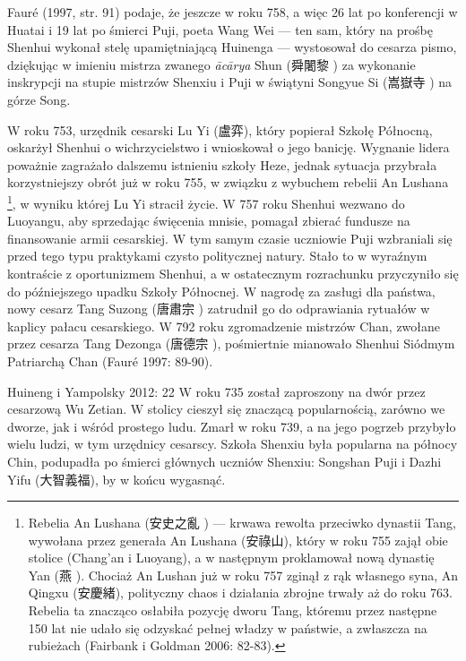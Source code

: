 Fauré (1997, str. 91) podaje, że jeszcze w roku 758, a więc 26 lat po konferencji w Huatai i 19 lat po śmierci Puji, poeta Wang Wei --- ten sam, który na prośbę Shenhui wykonał stelę upamiętniającą Huinenga --- wystosował do cesarza pismo, dziękując w imieniu mistrza zwanego \textit{ācārya} Shun (舜闍黎 ) za wykonanie inskrypcji na stupie mistrzów Shenxiu i Puji w świątyni Songyue Si (嵩嶽寺 ) na górze Song.

W roku 753, urzędnik cesarski Lu Yi (盧弈), który popierał Szkołę Północną, oskarżył Shenhui o wichrzycielstwo i wnioskował o jego banicję.
Wygnanie lidera poważnie zagrażało dalszemu istnieniu szkoły Heze, jednak sytuacja przybrała korzystniejszy obrót już w roku 755, w związku z wybuchem rebelii An Lushana%
\footnote{Rebelia An Lushana (安史之亂 ) --- krwawa rewolta przeciwko dynastii Tang, wywołana przez generała An Lushana (安祿山), który w roku 755 zajął obie stolice (Chang'an i Luoyang), a w następnym proklamował nową dynastię Yan (燕 ). Chociaż An Lushan już w roku 757 zginął z rąk własnego syna, An Qingxu (安慶緒), polityczny chaos i działania zbrojne trwały aż do roku 763. Rebelia ta znacząco osłabiła pozycję dworu Tang, któremu przez następne 150 lat nie udało się odzyskać pełnej władzy w państwie, a zwłaszcza na rubieżach (Fairbank i Goldman 2006: 82-83).}, w wyniku której Lu Yi stracił życie.
W 757 roku Shenhui wezwano do Luoyangu, aby sprzedając święcenia mnisie, pomagał zbierać fundusze na finansowanie armii cesarskiej.
W tym samym czasie uczniowie Puji wzbraniali się przed tego typu praktykami czysto politycznej natury.
Stało to w wyraźnym kontraście z oportunizmem Shenhui, a w ostatecznym rozrachunku przyczyniło się do późniejszego upadku Szkoły Północnej.
W nagrodę za zasługi dla państwa, nowy cesarz Tang Suzong	(唐肅宗 ) zatrudnił go do odprawiania rytuałów w kaplicy pałacu cesarskiego.
W 792 roku zgromadzenie mistrzów Chan, zwołane przez cesarza Tang Dezonga (唐德宗 ), pośmiertnie mianowało Shenhui Siódmym Patriarchą Chan
(Fauré 1997: 89-90).

Huineng i Yampolsky 2012: 22
W roku 735 został zaproszony na dwór przez cesarzową Wu Zetian. W stolicy cieszył się znaczącą popularnością, zarówno we dworze, jak i wśród prostego ludu.
Zmarł w roku 739, a na jego pogrzeb przybyło wielu ludzi, w tym urzędnicy cesarscy.
Szkoła Shenxiu była popularna na północy Chin, podupadła po śmierci głównych uczniów Shenxiu: Songshan Puji i Dazhi Yifu (大智義福), by w końcu wygasnąć. %

